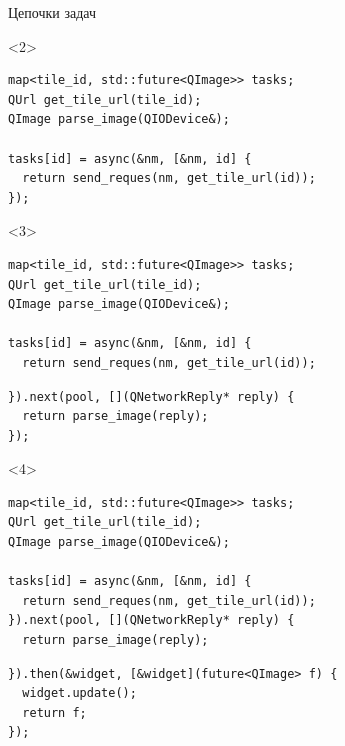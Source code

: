 \documentclass[aspectratio=169,pdf,hyperref={unicode},17pt]{beamer}
\begin{document}
\begin{frame}[fragile,t]{Цепочки задач}
\begin{onlyenv}<2>
\begin{lstlisting}[style=cppcode,aboveskip=0pt,belowskip=0pt]
map<tile_id, std::future<QImage>> tasks;
QUrl get_tile_url(tile_id);
QImage parse_image(QIODevice&);

tasks[id] = async(&nm, [&nm, id] {
  return send_reques(nm, get_tile_url(id));
});
\end{lstlisting}
\end{onlyenv}
\begin{onlyenv}<3>
\begin{lstlisting}[style=cppcode,aboveskip=0pt,belowskip=0pt]
map<tile_id, std::future<QImage>> tasks;
QUrl get_tile_url(tile_id);
QImage parse_image(QIODevice&);

tasks[id] = async(&nm, [&nm, id] {
  return send_reques(nm, get_tile_url(id));
\end{lstlisting}
\begin{lstlisting}[style=cppcode,backgroundcolor=\color{gray!30},aboveskip=0pt,belowskip=0pt]
}).next(pool, [](QNetworkReply* reply) {
  return parse_image(reply);
});
\end{lstlisting}
\end{onlyenv}
\begin{onlyenv}<4>
\begin{lstlisting}[style=cppcode,aboveskip=0pt,belowskip=0pt]
map<tile_id, std::future<QImage>> tasks;
QUrl get_tile_url(tile_id);
QImage parse_image(QIODevice&);

tasks[id] = async(&nm, [&nm, id] {
  return send_reques(nm, get_tile_url(id));
}).next(pool, [](QNetworkReply* reply) {
  return parse_image(reply);
\end{lstlisting}
\begin{lstlisting}[style=cppcode,backgroundcolor=\color{gray!30},aboveskip=0pt,belowskip=0pt]
}).then(&widget, [&widget](future<QImage> f) {
  widget.update();
  return f;
});
\end{lstlisting}
\end{onlyenv}
\end{frame}
\end{document}
